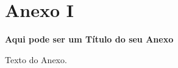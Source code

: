 \chapter{Anexo I}
\label{anex1}
\begin{center}
    \textbf{Aqui pode ser um Título do seu Anexo}
\end{center}

Texto do Anexo.
